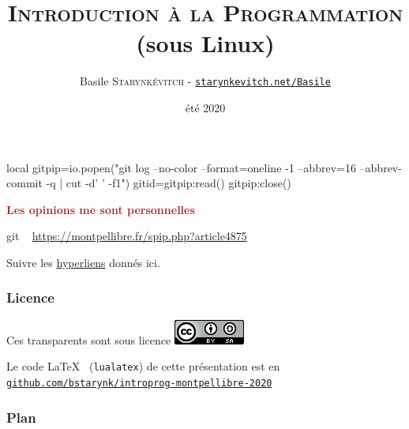 \documentclass[xcolor=svgnames,final,smaller,a4]{beamer}
\title{\textsc{Introduction à la Programmation} \\
(sous Linux)}
\author[B.Starynkevitch]{Basile \textsc{Starynkévitch} - \href{http://starynkevitch.net/Basile/}{\texttt{starynkevitch.net/Basile}}\\ \href{mailto:basile@starynkevitch.net}{\color{blue}{\texttt{basile@starynkevitch.net}}}
} %
\institute{MontPellibre (Montpellier)}
\date{été 2020}
\begin{document}
 \begin{luacode*}
   local gitpip=io.popen("git log --no-color --format=oneline -1 --abbrev=16 --abbrev-commit -q | cut -d' ' -f1")
   gitid=gitpip:read()
   gitpip:close()
 \end{luacode*}
  \newcommand{\mygitid}{\luadirect{tex.print(gitid)}}

 \begin{frame}
   
   
   \begin{relsize}{-1.5}
        \titlepage
        \textcolor{brown}{{\large \textbf{Les opinions me sont personnelles}} }
        
        \begin{center}
          git \texttt{\mygitid} ~ 
          \href{https://montpellibre.fr/spip.php?article4875}{https://montpellibre.fr/spip.php?article4875}

          Suivre les \href{https://fr.wikipedia.org/wiki/Hyperlien}{hyperliens} donnés ici.
        \end{center}
   \end{relsize}
\end{frame}

 \begin{frame}
    \frametitle{Licence}
    
    Ces transparents sont sous licence \href{https://creativecommons.org/licenses/by-sa/4.0/}{\includegraphics[scale=0.75]{CC-BY-SA-4}} 

    \vspace{1cm}
          Le code \LaTeX ~ (\texttt{lualatex}) de cette présentation est en \href{https://github.com/bstarynk/introprog-montpellibre-2020/}{\texttt{github.com/bstarynk/introprog-montpellibre-2020}}
 \end{frame}
 
 \begin{frame}
    \frametitle{Plan}
    
   \tableofcontents
 \end{frame}


\end{document}
